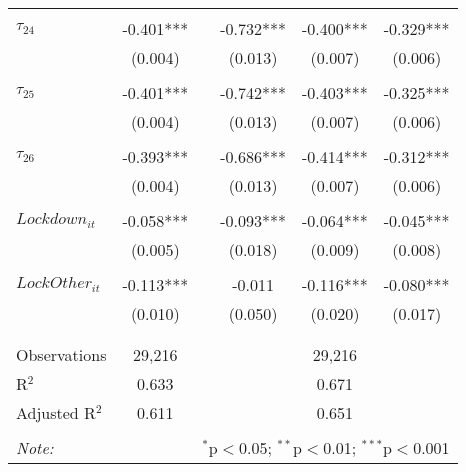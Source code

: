 \begin{tabular}{@{\extracolsep{-0pt}}lccccc}
                &           &&           &           &           \\[-2.1ex]
$\tau_{24}$     & -0.401*** && -0.732*** & -0.400*** & -0.329*** \\
                &  (0.004)  &&  (0.013)  &  (0.007)  &  (0.006)  \\
                &           &&           &           &           \\[-2.1ex]
$\tau_{25}$     & -0.401*** && -0.742*** & -0.403*** & -0.325*** \\
                &  (0.004)  &&  (0.013)  &  (0.007)  &  (0.006)  \\
                &           &&           &           &           \\[-2.1ex]
$\tau_{26}$     & -0.393*** && -0.686*** & -0.414*** & -0.312*** \\
                &  (0.004)  &&  (0.013)  &  (0.007)  &  (0.006)  \\
                &           &&           &           &           \\[-1.ex]
$Lockdown_{it}$        & -0.058*** && -0.093*** & -0.064*** & -0.045*** \\
                &  (0.005)  &&  (0.018)  &  (0.009)  &  (0.008)  \\
                &           &&           &           &           \\[-2.1ex]
$LockOther_{it}$ & -0.113*** &&   -0.011  & -0.116*** & -0.080*** \\
                &  (0.010)  &&  (0.050)  &  (0.020)  &  (0.017)  \\
                &           &&           &           &           \\[-2.1ex]

\hline \\[-1.8ex] 
Observations     & 29,216 && \multicolumn{3}{c}{29,216} \\ 
R$^{2}$          &  0.633 && \multicolumn{3}{c}{0.671 } \\ 
Adjusted R$^{2}$ &  0.611 && \multicolumn{3}{c}{0.651 } \\ 
\hline 
\hline \\[-1.8ex] 
\textit{Note:}  & \multicolumn{5}{r}{$^{*}$p$<$0.05; $^{**}$p$<$0.01; $^{***}$p$<$0.001} \\ 
\end{tabular} 